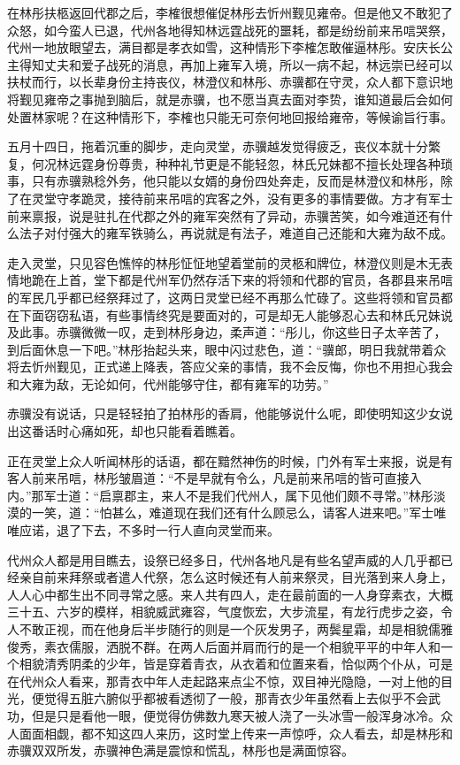 在林彤扶柩返回代郡之后，李榷很想催促林彤去忻州觐见雍帝。但是他又不敢犯了众怒，如今蛮人已退，代州各地得知林远霆战死的噩耗，都是纷纷前来吊唁哭祭，代州一地放眼望去，满目都是孝衣如雪，这种情形下李榷怎敢催逼林彤。安庆长公主得知丈夫和爱子战死的消息，再加上雍军入境，所以一病不起，林远崇已经可以扶杖而行，以长辈身份主持丧仪，林澄仪和林彤、赤骥都在守灵，众人都下意识地将觐见雍帝之事抛到脑后，就是赤骥，也不愿当真去面对李贽，谁知道最后会如何处置林家呢？在这种情形下，李榷也只能无可奈何地回报给雍帝，等候谕旨行事。

五月十四日，拖着沉重的脚步，走向灵堂，赤骥越发觉得疲乏，丧仪本就十分繁复，何况林远霆身份尊贵，种种礼节更是不能轻忽，林氏兄妹都不擅长处理各种琐事，只有赤骥熟稔外务，他只能以女婿的身份四处奔走，反而是林澄仪和林彤，除了在灵堂守孝跪灵，接待前来吊唁的宾客之外，没有更多的事情要做。方才有军士前来禀报，说是驻扎在代郡之外的雍军突然有了异动，赤骥苦笑，如今难道还有什么法子对付强大的雍军铁骑么，再说就是有法子，难道自己还能和大雍为敌不成。

走入灵堂，只见容色憔悴的林彤怔怔地望着堂前的灵柩和牌位，林澄仪则是木无表情地跪在上首，堂下都是代州军仍然存活下来的将领和代郡的官员，各郡县来吊唁的军民几乎都已经祭拜过了，这两日灵堂已经不再那么忙碌了。这些将领和官员都在下面窃窃私语，有些事情终究是要面对的，可是却无人能够忍心去和林氏兄妹说及此事。赤骥微微一叹，走到林彤身边，柔声道：“彤儿，你这些日子太辛苦了，到后面休息一下吧。”林彤抬起头来，眼中闪过悲色，道：“骥郎，明日我就带着众将去忻州觐见，正式递上降表，答应父亲的事情，我不会反悔，你也不用担心我会和大雍为敌，无论如何，代州能够守住，都有雍军的功劳。”

赤骥没有说话，只是轻轻拍了拍林彤的香肩，他能够说什么呢，即使明知这少女说出这番话时心痛如死，却也只能看着瞧着。

正在灵堂上众人听闻林彤的话语，都在黯然神伤的时候，门外有军士来报，说是有客人前来吊唁，林彤皱眉道：“不是早就有令么，凡是前来吊唁的皆可直接入内。”那军士道：“启禀郡主，来人不是我们代州人，属下见他们颇不寻常。”林彤淡漠的一笑，道：“怕甚么，难道现在我们还有什么顾忌么，请客人进来吧。”军士唯唯应诺，退了下去，不多时一行人直向灵堂而来。

代州众人都是用目瞧去，设祭已经多日，代州各地凡是有些名望声威的人几乎都已经亲自前来拜祭或者遣人代祭，怎么这时候还有人前来祭灵，目光落到来人身上，人人心中都生出不同寻常之感。来人共有四人，走在最前面的一人身穿素衣，大概三十五、六岁的模样，相貌威武雍容，气度恢宏，大步流星，有龙行虎步之姿，令人不敢正视，而在他身后半步随行的则是一个灰发男子，两鬓星霜，却是相貌儒雅俊秀，素衣儒服，洒脱不群。在两人后面并肩而行的是一个相貌平平的中年人和一个相貌清秀阴柔的少年，皆是穿着青衣，从衣着和位置来看，恰似两个仆从，可是在代州众人看来，那青衣中年人走起路来点尘不惊，双目神光隐隐，一对上他的目光，便觉得五脏六腑似乎都被看透彻了一般，那青衣少年虽然看上去似乎不会武功，但是只是看他一眼，便觉得仿佛数九寒天被人浇了一头冰雪一般浑身冰冷。众人面面相觑，都不知这四人来历，这时堂上传来一声惊呼，众人看去，却是林彤和赤骥双双所发，赤骥神色满是震惊和慌乱，林彤也是满面惊容。

